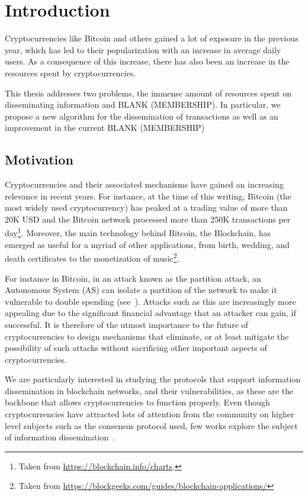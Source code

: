 \chapter{Introduction}
Cryptocurrencies like Bitcoin and others gained a lot of exposure in the previous year, which has led to their popularization with an increase in average daily users. As a consequence of this increase, there has also been an increase in the resources spent by cryptocurrencies.

This thesis addresses two problems, the immense amount of resources spent on disseminating information and BLANK (MEMBERSHIP). In particular, we propose a new algorithm for the dissemination of transactions as well as an improvement in the current BLANK (MEMBERSHIP)
\section{Motivation}
Cryptocurrencies and their associated mechanisms have gained an increasing relevance in recent years. For instance, at the time of this writing, Bitcoin (the most widely used cryptocurrency) has peaked at a trading value of more than 20K USD and the Bitcoin network processed more than 250K transactions per day\footnote{Taken from \url{https://blockchain.info/charts}.}. Moreover, the main technology behind Bitcoin, the Blockchain, has emerged as useful for a myriad of other applications, from birth, wedding, and death certificates to the monetization of music\footnote{Taken from \url{https://blockgeeks.com/guides/blockchain-applications/}}.

For instance in Bitcoin, in an attack known as the partition attack,  an Autonomous System (AS) can isolate a partition of the network to make it vulnerable to double spending (see~\cite{apostolaki2016hijacking}).
Attacks such as this are increasingly more appealing due to the significant financial advantage that an attacker can gain, if successful.
It is therefore of the utmost importance to the future of cryptocurrencies to design mechanisms that eliminate, or at least mitigate the possibility of such attacks without sacrificing other important aspects of cryptocurrencies.

We are particularly interested in studying the protocols that support information dissemination in blockchain networks, and their vulnerabilities, as these are the backbone that allows cryptocurrencies to function properly.
Even though cryptocurrencies have attracted lots of attention from the community on higher level subjects such as the consensus protocol used, few works explore the subject of information dissemination~\cite{miller2015discovering, heilman2015eclipse, bojja2017dandelion, owenson2017proximity}.

